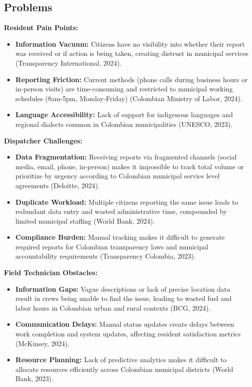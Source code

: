 \documentclass[12pt,a4paper]{article}
\begin{document}
\subsection{Problems}

\textbf{Resident Pain Points:}
\begin{itemize}
    \item \textbf{Information Vacuum:} Citizens have no visibility into whether their report was received or if action is being taken, creating distrust in municipal services (Transparency International, 2024).
    \item \textbf{Reporting Friction:} Current methods (phone calls during business hours or in-person visits) are time-consuming and restricted to municipal working schedules (8am-5pm, Monday-Friday) (Colombian Ministry of Labor, 2024).
    \item \textbf{Language Accessibility:} Lack of support for indigenous languages and regional dialects common in Colombian municipalities (UNESCO, 2023).
\end{itemize}

\textbf{Dispatcher Challenges:}
\begin{itemize}
    \item \textbf{Data Fragmentation:} Receiving reports via fragmented channels (social media, email, phone, in-person) makes it impossible to track total volume or prioritize by urgency according to Colombian municipal service level agreements (Deloitte, 2024).
    \item \textbf{Duplicate Workload:} Multiple citizens reporting the same issue leads to redundant data entry and wasted administrative time, compounded by limited municipal staffing (World Bank, 2024).
    \item \textbf{Compliance Burden:} Manual tracking makes it difficult to generate required reports for Colombian transparency laws and municipal accountability requirements (Transparency Colombia, 2023).
\end{itemize}

\textbf{Field Technician Obstacles:}
\begin{itemize}
    \item \textbf{Information Gaps:} Vague descriptions or lack of precise location data result in crews being unable to find the issue, leading to wasted fuel and labor hours in Colombian urban and rural contexts (BCG, 2024).
    \item \textbf{Communication Delays:} Manual status updates create delays between work completion and system updates, affecting resident satisfaction metrics (McKinsey, 2024).
    \item \textbf{Resource Planning:} Lack of predictive analytics makes it difficult to allocate resources efficiently across Colombian municipal districts (World Bank, 2023).
\end{itemize}
\end{document}
